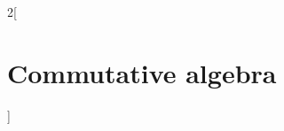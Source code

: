\documentclass[../../../main_math.tex]{subfiles}
\begin{document}
\begin{multicols}{2}[\section{Commutative algebra}]

\end{multicols}
\end{document}
